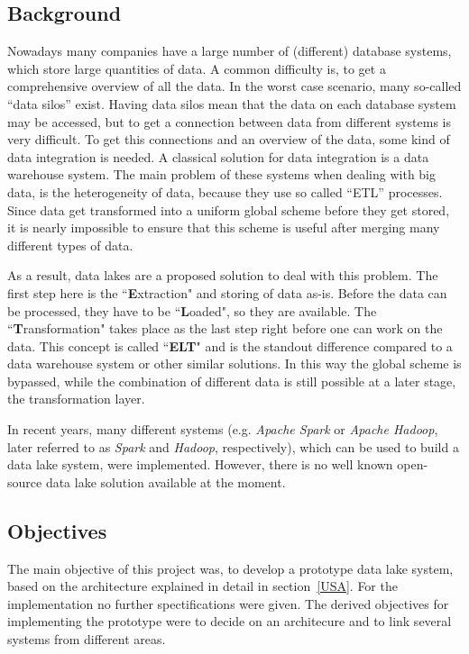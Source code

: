 \documentclass[conference]{IEEEtran}
\begin{document}
\subsection{Background}\label{BGD}
Nowadays many companies have a large number of (different) database systems, which store large 
quantities of data. 
A common difficulty is, to get a comprehensive overview of all the data.
In the worst case scenario, many so-called ``data silos'' exist. 
Having data silos mean that the data on each database system may be accessed, but to
get a connection between data from different systems is very difficult.
To get this connections and an overview of the data, some kind of data integration is needed.
A classical solution for data integration is a data warehouse system.
The main problem of these systems when dealing with big data, is the heterogeneity of data, 
because they use so called ``ETL'' processes. 
Since data get transformed into a uniform global scheme before they get stored, it is nearly 
impossible to ensure that this scheme is useful after merging many different types of data.

As a result, data lakes\cite{Quix2018} are a proposed solution\cite{Dixon2010} to deal with this 
problem.
The first step here is the ``\textbf{E}xtraction" and storing of data as-is.
Before the data can be processed, they have to be ``\textbf{L}oaded", so they are available.
The ``\textbf{T}ransformation" takes place as the last step right before one can work on the data. 
This concept is called ``\textbf{ELT}" and is the standout difference compared to a data warehouse 
system or other similar solutions. 
In this way the global scheme is bypassed, while the combination of different data is still possible
at a later stage, the transformation layer.

In recent years, many different systems (e.g. \textit{Apache Spark} or \textit{Apache Hadoop}, later 
referred to as \textit{Spark} and \textit{Hadoop}, respectively), which can be used to build a data
lake system, were implemented.
However, there is no well known open-source data lake solution available at the moment.


\subsection{Objectives}\label{AOB}
The main objective of this project was, to develop a prototype data lake system, based on the 
architecture explained in detail in section~\ref{USA}.
For the implementation no further spectifications were given.
The derived objectives for implementing the prototype were to decide on an architecure and to 
link several systems from different areas.
\end{document}
